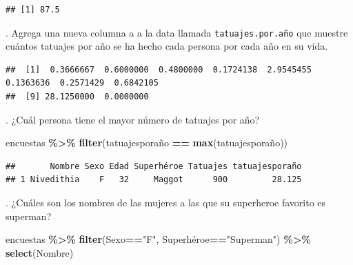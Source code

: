 \documentclass[
]{book}
\newenvironment{Shaded}{\begin{snugshade}}{\end{snugshade}}
\newcommand{\FunctionTok}[1]{\textcolor[rgb]{0.13,0.29,0.53}{\textbf{#1}}}
\newcommand{\NormalTok}[1]{#1}
\newcommand{\OtherTok}[1]{\textcolor[rgb]{0.56,0.35,0.01}{#1}}
\newcommand{\SpecialCharTok}[1]{\textcolor[rgb]{0.81,0.36,0.00}{\textbf{#1}}}
\newcommand{\StringTok}[1]{\textcolor[rgb]{0.31,0.60,0.02}{#1}}
\begin{document}
\begin{verbatim}
## [1] 87.5
\end{verbatim}

\hfill{}.
Agrega una nueva columna a a la data llamada \texttt{tatuajes.por.año} que muestre cuántos tatuajes por año se ha hecho cada persona por cada año en su vida.\\

\begin{Shaded}
\end{Shaded}

\begin{verbatim}
##  [1]  0.3666667  0.6000000  0.4800000  0.1724138  2.9545455  0.1363636  0.2571429  0.6842105
##  [9] 28.1250000  0.0000000
\end{verbatim}

\hfill{}.
¿Cuál persona tiene el mayor número de tatuajes por año?\\

\begin{Shaded}
\begin{Highlighting}[]
\NormalTok{encuestas  }\SpecialCharTok{\%\textgreater{}\%} \FunctionTok{filter}\NormalTok{(tatuajesporaño }\SpecialCharTok{==} \FunctionTok{max}\NormalTok{(tatuajesporaño)) }
\end{Highlighting}
\end{Shaded}

\begin{verbatim}
##       Nombre Sexo Edad Superhéroe Tatuajes tatuajesporaño
## 1 Nivedithia    F   32     Maggot      900         28.125
\end{verbatim}

\hfill{}.
¿Cuáles son los nombres de las mujeres a las que su superheroe favorito es superman?\\

\begin{Shaded}
\begin{Highlighting}[]
\NormalTok{encuestas }\SpecialCharTok{\%\textgreater{}\%} \FunctionTok{filter}\NormalTok{(Sexo}\SpecialCharTok{==}\StringTok{"F"}\NormalTok{, Superhéroe}\SpecialCharTok{==}\StringTok{"Superman"}\NormalTok{) }\SpecialCharTok{\%\textgreater{}\%} \FunctionTok{select}\NormalTok{(Nombre)}
\end{Highlighting}
\end{Shaded}
\end{document}
